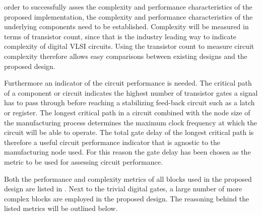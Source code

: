  order to successfully asses the complexity and performance characteristics of the proposed implementation, the complexity and performance characteristics of the underlying components need to be established. Complexity will be measured in terms of transistor count, since that is the industry leading way to indicate complexity of digital \ac{VLSI} circuits. Using the transistor count to measure circuit complexity therefore allows easy comparisons between existing designs and the proposed design.

Furthermore an indicator of the circuit performance is needed. The critical path of a component or circuit indicates the highest number of transistor gates a signal has to pass through before reaching a stabilizing feed-back circuit such as a latch or register. The longest critical path in a circuit combined with the node size of the manufacturing process determines the maximum clock frequency at which the circuit will be able to operate. The total gate delay of the longest critical path is therefore a useful circuit performance indicator that is agnostic to the manufacturing node used. For this reason the gate delay has been chosen as the metric to be used for assessing circuit performance.

Both the performance and complexity metrics of all blocks used in the proposed design are listed in . Next to the trivial digital gates, a large number of more complex blocks are employed in the proposed design. The reasoning behind the listed metrics will be outlined below.

